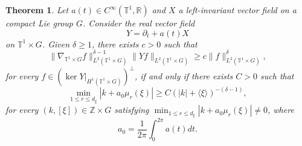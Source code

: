\documentclass[11pt]{amsart}
\newtheorem{theorem}{Theorem}
\numberwithin{theorem}{section}
\numberwithin{equation}{section}
\theoremstyle{definition}
\numberwithin{example}{section}
\theoremstyle{definition}
\theoremstyle{definition}
\newcommand{\R}{\mathbb{R}}
\newcommand{\Z}{\mathbb{Z}}
\newcommand{\T}{\mathbb{T}}
\begin{document}
\begin{theorem}\label{theo_poincare_tube}
    Let $a(t)\in C^\infty(\T^1,\R)$ and $X$ a left-invariant vector field on a compact Lie group $G$. Consider the real vector field
\begin{equation}\label{eq_tube_vector}
    Y= \partial_t+a(t)X
\end{equation}
 on $\T^1\times G$. Given $\delta\geq 1$, there exists $c>0$ such that
\begin{equation}\label{ineq_poincare_variable_coef}
    \|\nabla_{\T^1\times G}f\|_{L^2(\T^1\times G)}^{\delta-1}\| Yf\|_{L^2(\T^1\times G)}\geq c\|f\|_{L^2(\T^1\times G)}^\delta,
\end{equation}
for every $f\in (\ker Y|_{H^1(\T^1\times G)})^\perp$, 
if and only if there exists $C>0$ such that
\begin{equation}\label{eq_diof_tube}
    \min_{1\leq r\leq d_\xi}| k+a_0\mu_r(\xi) |\geq C(|k|+\langle\xi\rangle)^{-(\delta-1)},
\end{equation}
for every $(k,[\xi])\in\Z\times G$ satisfying $ \min_{1\leq r\leq d_\xi}| k+a_0\mu_r(\xi) |\neq 0$, where
\begin{equation*}
    a_0=\frac{1}{2\pi}\int_{0}^{2\pi} a(t)dt.
\end{equation*}
\end{theorem}
\end{document}
